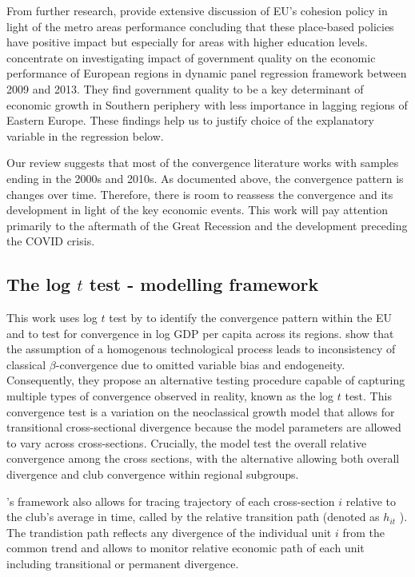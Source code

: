 \documentclass[11pt]{article}
\begin{document}
From further research, \citet{ehrlich2020place} provide extensive discussion of EU’s cohesion policy in light of the metro areas performance concluding that these place-based policies have positive impact but especially for areas with higher education levels. \citet{rodriguez2020institutional} concentrate on investigating impact of government quality on the economic performance of European regions in dynamic panel regression framework between 2009 and 2013. They find government quality to be a key determinant of economic growth in Southern periphery with less importance in lagging regions of Eastern Europe. These findings help us to justify choice of the explanatory variable in the regression below.

Our review suggests that most of the convergence literature works with samples ending in the 2000s and 2010s. As documented above, the convergence pattern is changes over time. Therefore, there is room to reassess the convergence and its development in light of the key economic events. This work will pay attention primarily to the aftermath of the Great Recession and the development preceding the COVID crisis.


\subsection{The log $t$ test - modelling framework}

This work uses log $t$ test by \citet{phillips2007transition}  to identify the convergence pattern within the EU and to test for convergence in log GDP per capita across its regions. \citet{phillips2007transition} show that the assumption of a homogenous technological process  leads to inconsistency of classical $\beta$-convergence due to omitted variable bias and endogeneity. Consequently, they propose an alternative testing procedure capable of capturing multiple types of convergence observed in reality, known as the log $t$ test. This convergence test is a variation on the neoclassical growth model that allows for transitional cross-sectional divergence  because the model parameters are allowed to vary across cross-sections.  Crucially, the model test the overall relative convergence among the cross sections, with the alternative allowing both overall divergence and club convergence within regional subgroups. 

\citeauthor{phillips2009economic}'s framework also allows for tracing  trajectory of each cross-section $i$ relative to the club's average in time, called by \citet{phillips2009economic} the relative transition path (denoted as $h_{it}$ ). The trandistion path reflects any divergence of the individual unit $i$ from the common trend and allows to monitor relative economic path of each unit including transitional or permanent divergence.
\end{document}
